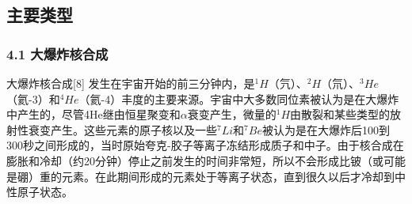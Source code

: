 \subsection{主要类型}
\subsubsection{4.1 大爆炸核合成}
大爆炸核合成[8] 发生在宇宙开始的前三分钟内，是$^1H$（氕）、$^2H$（氘）、$^3He$（氦-3）和$^4He$（氦-4）丰度的主要来源。宇宙中大多数同位素被认为是在大爆炸中产生的，尽管4He继由恒星聚变和$\alpha$衰变产生，微量的$^1H$由散裂和某些类型的放射性衰变产生。这些元素的原子核以及一些$^7Li$和$^7Be$被认为是在大爆炸后100到300秒之间形成的，当时原始夸克-胶子等离子冻结形成质子和中子。由于核合成在膨胀和冷却（约20分钟）停止之前发生的时间非常短，所以不会形成比铍（或可能是硼）重的元素。在此期间形成的元素处于等离子状态，直到很久以后才冷却到中性原子状态。